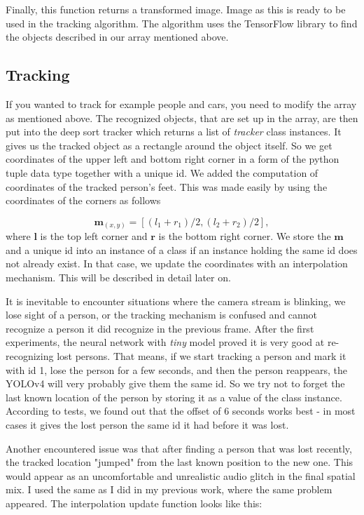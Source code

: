 \documentclass{ctuthesis}
\begin{document}
Finally, this function returns a transformed image. Image as this is ready to be used in the tracking algorithm. The algorithm uses the TensorFlow library to find the objects described in our array mentioned above.

\subsection{Tracking} \label{tracking}
If you wanted to track for example people and cars, you need to modify the array as mentioned above. The recognized objects, that are set up in the array, are then put into the deep sort tracker which returns a list of \textit{tracker} class instances. It gives us the tracked object as a rectangle around the object itself. So we get coordinates of the upper left and bottom right corner in a form of the python tuple data type together with a unique id. We added the computation of coordinates of the tracked person's feet. This was made easily by using the coordinates of the corners as follows

\begin{equation}
\textbf{m}_{(x, y)} = [(l_1 + r_1)/2, (l_2 + r_2)/2],
\end{equation}
where \(\textbf{l}\) is the top left corner and \(\textbf{r}\) is the bottom right corner. We store the \(\textbf{m}\) and a unique id into an instance of a class if an instance holding the same id does not already exist. In that case, we update the coordinates with an interpolation mechanism. This will be described in detail later on.

It is inevitable to encounter situations where the camera stream is blinking, we lose sight of a person, or the tracking mechanism is confused and cannot recognize a person it did recognize in the previous frame. After the first experiments, the neural network with \textit{tiny} model proved it is very good at re-recognizing lost persons. That means, if we start tracking a person and mark it with id 1, lose the person for a few seconds, and then the person reappears, the YOLOv4 will very probably give them the same id. So we try not to forget the last known location of the person by storing it as a value of the class instance. According to tests, we found out that the offset of 6 seconds works best - in most cases it gives the lost person the same id it had before it was lost. 

Another encountered issue was that after finding a person that was lost recently, the tracked location "jumped" from the last known position to the new one. This would appear as an uncomfortable and unrealistic audio glitch in the final spatial mix. I used the same as I did in my previous work, where the same problem appeared. The interpolation update function looks like this:
\end{document}
